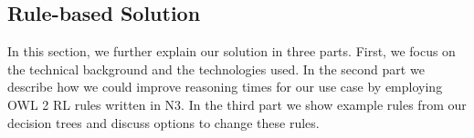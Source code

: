 % 










\subsection{Rule-based Solution}\label{details}



In this section, we further explain our solution in three parts.
First, we focus on the technical background and the technologies used. %
In the second part we describe 
how we could improve reasoning times for our use case by employing OWL 2 RL rules written in N3. 
In the third part we show example rules from our decision trees and discuss options to change these rules. %

